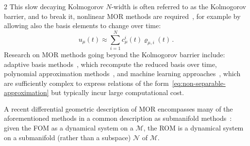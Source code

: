 \documentclass{article}
\newcommand{\M}{\mathcal{M}}                                %
\begin{document}
\begin{multicols}{2}
This slow decaying Kolmogorov $N$-width is often referred to as the Kolmogorov barrier, and to break it, nonlinear MOR methods are required~\cite{Peherstorfer2022}, for example by allowing also the basis elements to change over time: 
\begin{equation}\label{eq:non-separable-approximation}
    u_\mu(t) \approx \sum_{i=1}^N c_{\mu}^i(t)\varrho_{\mu,i}(t)\,. %
\end{equation}
Research on MOR methods going beyond the Kolmogorov barrier include: adaptive basis methods~\cite{Peherstorfer2020,Selvaraj2024}, which recompute the reduced basis over time, polynomial approximation methods~\cite{Sharma2023,Barnett2023,Geelen2023}, and machine learning approaches~\cite{Lee2020,Buchfink2023c,Chen2023,Barnett2023,Romor2025}, which are sufficiently complex to express relations of the form~\eqref{eq:non-separable-approximation} but typically incur large computational cost. 

A recent differential geometric description of MOR encompasses many of the aforementioned methods in a common description as submanifold methods~\cite{Buchfink2023a}: given the FOM as a dynamical system on a $\M$, the ROM is a dynamical system on a submanifold (rather than a subspace) $\mathcal{N}$ of $\M$.


\end{multicols}
\end{document}
